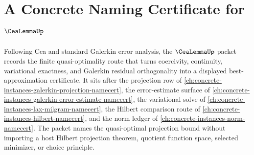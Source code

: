 \chapter{A Concrete Naming Certificate for $\CeaLemmaUp$}
\label{ch:concrete-instances-cea-lemma-namecert}

Following Cea and standard Galerkin error analysis, the $\CeaLemmaUp$ packet records the finite quasi-optimality route that turns coercivity, continuity, variational exactness, and Galerkin residual orthogonality into a displayed best-approximation certificate. It sits after the projection row of \autoref{ch:concrete-instances-galerkin-projection-namecert}, the error-estimate surface of \autoref{ch:concrete-instances-galerkin-error-estimate-namecert}, the variational solve of \autoref{ch:concrete-instances-lax-milgram-namecert}, the Hilbert comparison route of \autoref{ch:concrete-instances-hilbert-namecert}, and the norm ledger of \autoref{ch:concrete-instances-norm-namecert}. The packet names the quasi-optimal projection bound without importing a host Hilbert projection theorem, quotient function space, selected minimizer, or choice principle.

